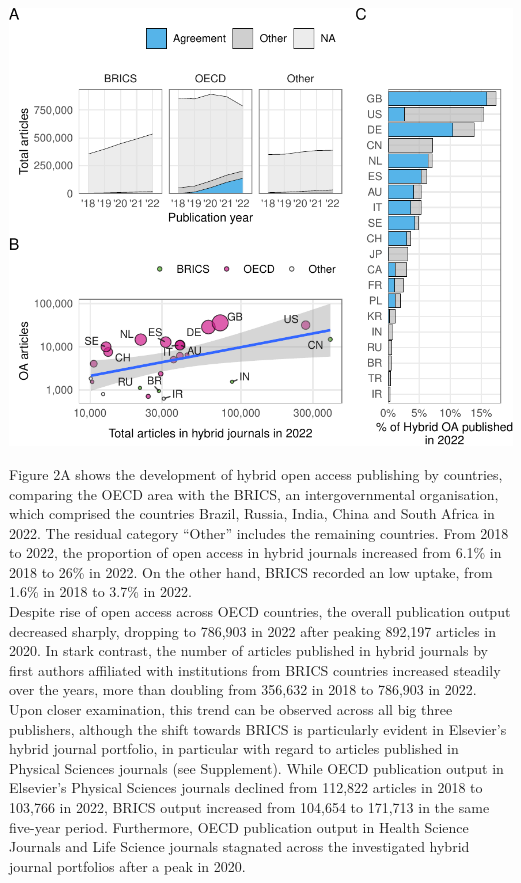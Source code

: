 \documentclass[a4paper,man,floatsintext,longtable,noextraspace,12pt]{apa6}
\begin{document}
\begin{center}\includegraphics[width=0.99\linewidth]{fig/country_patch-1} \end{center}

Figure 2A shows the development of hybrid open access publishing by
countries, comparing the OECD area with the BRICS, an intergovernmental
organisation, which comprised the countries Brazil, Russia, India, China
and South Africa in 2022. The residual category ``Other'' includes the
remaining countries. From 2018 to 2022, the proportion of open access in
hybrid journals increased from 6.1\% in 2018 to 26\% in 2022. On the
other hand, BRICS recorded an low uptake, from 1.6\% in 2018 to 3.7\% in
2022.\\
Despite rise of open access across OECD countries, the overall
publication output decreased sharply, dropping to 786,903 in 2022 after
peaking 892,197 articles in 2020. In stark contrast, the number of
articles published in hybrid journals by first authors affiliated with
institutions from BRICS countries increased steadily over the years,
more than doubling from 356,632 in 2018 to 786,903 in 2022. Upon closer
examination, this trend can be observed across all big three publishers,
although the shift towards BRICS is particularly evident in Elsevier's
hybrid journal portfolio, in particular with regard to articles
published in Physical Sciences journals (see Supplement). While OECD
publication output in Elsevier's Physical Sciences journals declined
from 112,822 articles in 2018 to 103,766 in 2022, BRICS output increased
from 104,654 to 171,713 in the same five-year period. Furthermore, OECD
publication output in Health Science Journals and Life Science journals
stagnated across the investigated hybrid journal portfolios after a peak
in 2020.
\end{document}
